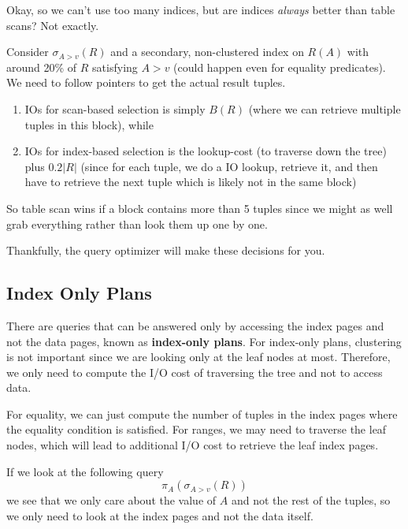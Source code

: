   Okay, so we can't use too many indices, but are indices \textit{always} better than table scans? Not exactly. 
  
  \begin{example}
    \label{ex:table-scans-wins}
    Consider $\sigma_{A > v} (R)$ and a secondary, non-clustered index on $R(A)$ with around 20\% of $R$ satisfying $A > v$ (could happen even for equality predicates). We need to follow pointers to get the actual result tuples. 
    \begin{enumerate}
      \item IOs for scan-based selection is simply $B(R)$ (where we can retrieve multiple tuples in this block), while 
      \item IOs for index-based selection is the lookup-cost (to traverse down the tree) plus $0.2 |R|$ (since for each tuple, we do a IO lookup, retrieve it, and then have to retrieve the next tuple which is likely not in the same block)
    \end{enumerate}
    So table scan wins if a block contains more than 5 tuples since we might as well grab everything rather than look them up one by one. 
  \end{example}

  Thankfully, the query optimizer will make these decisions for you. 

\subsection{Index Only Plans}

  \begin{definition}
    \label{def:index-only-plans}
    There are queries that can be answered only by accessing the index pages and not the data pages, known as \textbf{index-only plans}. For index-only plans, clustering is not important since we are looking only at the leaf nodes at most. Therefore, we only need to compute the I/O cost of traversing the tree and not to access data. 

    For equality, we can just compute the number of tuples in the index pages where the equality condition is satisfied. For ranges, we may need to traverse the leaf nodes, which will lead to additional I/O cost to retrieve the leaf index pages. 
  \end{definition}

  \begin{example}
    \label{ex:index-only-queries}
    If we look at the following query 
    \begin{equation}
      \pi_A (\sigma_{A > v} (R))
    \end{equation}
    we see that we only care about the value of $A$ and not the rest of the tuples, so we only need to look at the index pages and not the data itself. 
  \end{example}

